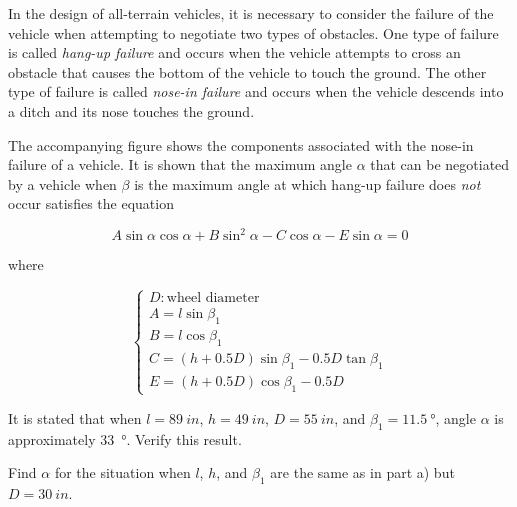 \documentclass[../../../../Assignments]{subfiles}
\begin{document}
\begin{exercise}
    In the design of all-terrain vehicles, it is necessary to consider the
    failure of the vehicle when attempting to negotiate two types of obstacles.
    One type of failure is called \emph{hang-up failure} and occurs when the
    vehicle attempts to cross an obstacle that causes the bottom of the vehicle
    to touch the ground. The other type of failure is called \emph{nose-in
    failure} and occurs when the vehicle descends into a ditch and its nose
    touches the ground.

    The accompanying figure shows the components associated with the nose-in
    failure of a vehicle. It is shown that the maximum angle \(\alpha\) that can
    be negotiated by a vehicle when \(\beta\) is the maximum angle at which
    hang-up failure does \emph{not} occur satisfies the equation

    \[A \sin{\alpha} \cos{\alpha} + B \sin^{2}{\alpha} - C \cos{\alpha} - E \sin{\alpha} = 0\]

    \noindent where

    \[\begin{cases}
        D: \text{wheel diameter} \\
        A = l \sin{\beta_1} \\
        B = l \cos{\beta_1} \\
        C = (h + \num{0.5} D) \sin{\beta_1} - \num{0.5} D \tan{\beta_1} \\
        E = (h + \num{0.5} D) \cos{\beta_1} - \num{0.5} D
    \end{cases}\]

    \begin{tasks}
        \task It is stated that when \(l = \qty{89}{in}\), \(h = \qty{49}{in}\),
            \(D = \qty{55}{in}\), and \(\beta_1 = \qty{11.5}{\degree}\), angle
            \(\alpha\) is approximately \qty{33}{\degree}. Verify this result.

        \task Find \(\alpha\) for the situation when \(l\), \(h\), and
            \(\beta_1\) are the same as in part a) but \(D = \qty{30}{in}\).
    \end{tasks}
\end{exercise}
\end{document}
